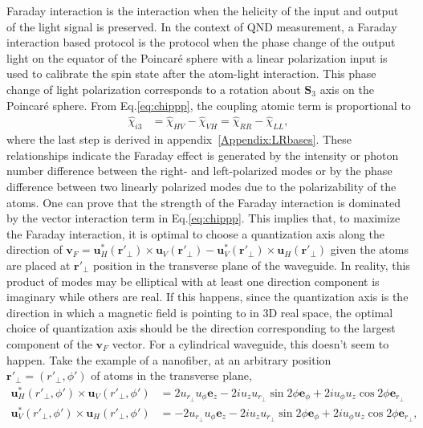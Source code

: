 \documentclass[preprint,aps,pra,onecolumn,superscriptaddress]{revtex4-1} %
\def\br{\mathbf{r}}
\newcommand{\Poincare}{Poincar\'e\xspace}
\begin{document}
Faraday interaction is the interaction when the helicity of the input and output of the light signal is preserved. 
In the context of QND measurement, a Faraday interaction based protocol is the protocol when the phase change of the output light on the equator of the \Poincare sphere with a linear polarization input is used to calibrate the spin state after the atom-light interaction.
This phase change of light polarization corresponds to a rotation about $ \mathbf{S}_3 $ axis on the \Poincare sphere. 
From Eq.\eqref{eq:chippp}, the coupling atomic term is proportional to 
\begin{align}
\hat{\chi}_{i3} &= \hat{\chi}_{HV}-\hat{\chi}_{VH}=\hat{\chi}_{RR}-\hat{\chi}_{LL},
\end{align}
where the last step is derived in appendix~\ref{Appendix:LRbases}. These relationships indicate the Faraday effect is generated by the intensity or photon number difference between the right- and left-polarized modes or by the phase difference between two linearly polarized modes due to the polarizability of the atoms.
One can prove that the strength of the Faraday interaction is dominated by the vector interaction term in Eq.\eqref{eq:chippp}.
This implies that, to maximize the Faraday interaction, it is optimal to choose a quantization axis along the direction of $ \mathbf{v}_F=\mathbf{u}_H^*(\br'\!_\perp)\!\times\!\mathbf{u}_{V}(\br'\!_\perp)\!-\!\mathbf{u}_V^*(\br'\!_\perp)\!\times\!\mathbf{u}_{H}(\br'\!_\perp)$ given the atoms are placed at $ \br'\!_\perp $ position in the transverse plane of the waveguide. 
In reality, this product of modes may be elliptical with at least one direction component is imaginary while others are real.
If this happens, since the quantization axis is the direction in which a magnetic field is pointing to in 3D real space, the optimal choice of quantization axis should be the direction corresponding to the largest component of the $ \mathbf{v}_F $ vector. 
For a cylindrical waveguide, this doesn't seem to happen.
Take the example of a nanofiber, at an arbitrary position $ \br'\!_\perp=(r'\!_\perp,\phi') $ of atoms in the transverse plane,
\begin{align}
\mathbf{u}_H^*(r'\!_\perp,\phi')\times \mathbf{u}_V(r'\!_\perp,\phi') &= 2u_{r\!_\perp} u_\phi\mathbf{e}_z - 2iu_zu_{r\!_\perp}\sin2\phi \mathbf{e}_\phi + 2iu_\phi u_z\cos2\phi \mathbf{e}_{r\!_\perp} \\
\mathbf{u}_V^*(r'\!_\perp,\phi')\times \mathbf{u}_H(r'\!_\perp,\phi') &= -2u_{r\!_\perp} u_\phi\mathbf{e}_z - 2iu_zu_{r\!_\perp}\sin2\phi \mathbf{e}_\phi + 2iu_\phi u_z\cos2\phi \mathbf{e}_{r\!_\perp},
\end{align}
\end{document}
